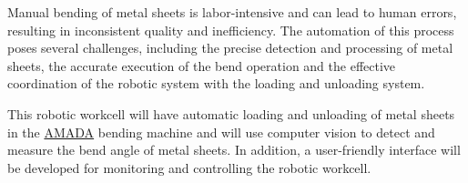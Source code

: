 Manual bending of metal sheets is labor-intensive and can 
lead to human errors, resulting in inconsistent quality
and inefficiency. The automation of this process poses
several challenges, including the precise detection and
processing of metal sheets, the accurate execution of
the bend operation and the effective coordination of
the robotic system with the loading and unloading system.

This robotic workcell will have automatic loading and unloading
of metal sheets in the \hyperref[tab:acronyms]{AMADA} bending machine and will use
computer vision to detect
and measure the bend angle of metal sheets.
In addition, a user-friendly interface will be developed for
monitoring and controlling the robotic workcell.